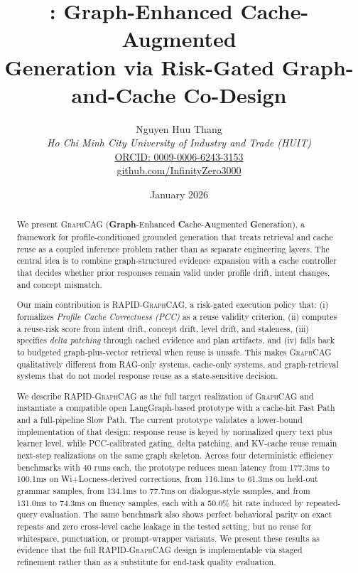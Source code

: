 \documentclass[11pt,a4paper,twocolumn]{article}
\title{
  \textbf{\graphcag{}: Graph-Enhanced Cache-Augmented\\
  Generation via Risk-Gated Graph-and-Cache Co-Design}
}
\author{
  Nguyen Huu Thang \\
  \textit{Ho Chi Minh City University of Industry and Trade (HUIT)} \\
  \href{https://orcid.org/0009-0006-6243-3153}{ORCID: 0009-0006-6243-3153} \\
  \href{https://github.com/InfinityZero3000}{github.com/InfinityZero3000}
}
\date{January 2026}
\newcommand{\graphcag}{\textsc{GraphCAG}}
\newcommand{\rapid}{\textsc{RAPID-GraphCAG}}
\begin{document}
\maketitle

\begin{abstract}
We present \graphcag{} (\textbf{Graph}-Enhanced \textbf{C}ache-\textbf{A}ugmented \textbf{G}eneration), a framework for profile-conditioned grounded generation that treats retrieval and cache reuse as a coupled inference problem rather than as separate engineering layers. The central idea is to combine graph-structured evidence expansion with a cache controller that decides whether prior responses remain valid under profile drift, intent changes, and concept mismatch.

Our main contribution is \rapid{}, a risk-gated execution policy that: (i) formalizes \emph{Profile Cache Correctness (PCC)} as a reuse validity criterion, (ii) computes a reuse-risk score from intent drift, concept drift, level drift, and staleness, (iii) specifies \emph{delta patching} through cached evidence and plan artifacts, and (iv) falls back to budgeted graph-plus-vector retrieval when reuse is unsafe. This makes \graphcag{} qualitatively different from RAG-only systems, cache-only systems, and graph-retrieval systems that do not model response reuse as a state-sensitive decision.

We describe \rapid{} as the full target realization of \graphcag{} and instantiate a compatible open LangGraph-based prototype with a cache-hit Fast Path and a full-pipeline Slow Path. The current prototype validates a lower-bound implementation of that design: response reuse is keyed by normalized query text plus learner level, while PCC-calibrated gating, delta patching, and KV-cache reuse remain next-step realizations on the same graph skeleton. Across four deterministic efficiency benchmarks with 40 runs each, the prototype reduces mean latency from 177.3ms to 100.1ms on Wi+Locness-derived corrections, from 116.1ms to 61.3ms on held-out grammar samples, from 134.1ms to 77.7ms on dialogue-style samples, and from 131.0ms to 74.3ms on fluency samples, each with a 50.0\% hit rate induced by repeated-query evaluation. The same benchmark also shows perfect behavioral parity on exact repeats and zero cross-level cache leakage in the tested setting, but no reuse for whitespace, punctuation, or prompt-wrapper variants. We present these results as evidence that the full \rapid{} design is implementable via staged refinement rather than as a substitute for end-task quality evaluation.
\end{abstract}
\end{document}
